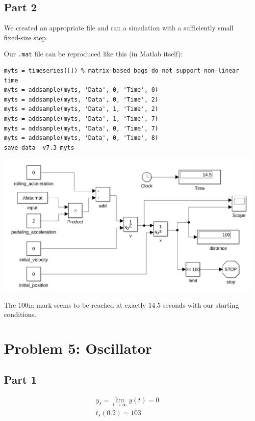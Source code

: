\documentclass[a4paper,parskip,headheight=38pt]{scrartcl} %
\begin{document}
\subsection*{Part 2}

We created an appropriate file and ran a simulation with a sufficiently
small fixed-size step.

 \pagebreak{}
Our \texttt{.mat} file can be reproduced like this (in Matlab itself):
\vspace{-\baselineskip}\begin{verbatim}
myts = timeseries([]) % matrix-based bags do not support non-linear time
myts = addsample(myts, 'Data', 0, 'Time', 0)
myts = addsample(myts, 'Data', 0, 'Time', 2)
myts = addsample(myts, 'Data', 1, 'Time', 2)
myts = addsample(myts, 'Data', 1, 'Time', 7)
myts = addsample(myts, 'Data', 0, 'Time', 7)
myts = addsample(myts, 'Data', 0, 'Time', 8)
save data -v7.3 myts
\end{verbatim}

\includegraphics[width=\textwidth]{p4b-proof-small}

The 100m mark seems to be reached at exactly 14.5 seconds with our
starting conditions.



\section*{Problem 5: Oscillator}

\subsection*{Part 1}
\begin{align*}
y_s = \lim_{t \to \infty} y(t) = 0 \\
t_s(0.2) = 103
\end{align*}
\end{document}
